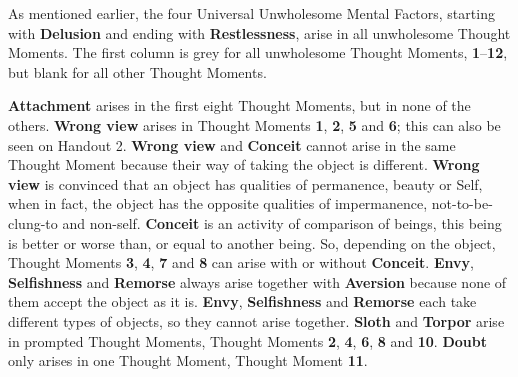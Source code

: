 As mentioned earlier, the four Universal Unwholesome Mental Factors, starting with \textbf{Delusion} and ending with \textbf{Restlessness}, arise in all unwholesome Thought Moments. The first column is grey for all unwholesome Thought Moments, \textbf{1}--\textbf{12}, but blank for all other Thought Moments.

\textbf{Attachment} arises in the first eight Thought Moments, but in none of the others. \textbf{Wrong view} arises in Thought Moments \textbf{1}, \textbf{2}, \textbf{5} and \textbf{6}; this can also be seen on Handout 2. \textbf{Wrong view} and \textbf{Conceit} cannot arise in the same Thought Moment because their way of taking the object is different. \textbf{Wrong view} is convinced that an object has qualities of permanence, beauty or Self, when in fact, the object has the opposite qualities of impermanence, not-to-be-clung-to and non-self. \textbf{Conceit} is an activity of comparison of beings, this being is better or worse than, or equal to another being. So, depending on the object, Thought Moments \textbf{3}, \textbf{4}, \textbf{7} and \textbf{8} can arise with or without \textbf{Conceit}. \textbf{Envy}, \textbf{Selfishness} and \textbf{Remorse} always arise together with \textbf{Aversion} because none of them accept the object as it is. \textbf{Envy}, \textbf{Selfishness} and \textbf{Remorse} each take different types of objects, so they cannot arise together. \textbf{Sloth} and \textbf{Torpor} arise in prompted Thought Moments, Thought Moments \textbf{2}, \textbf{4}, \textbf{6}, \textbf{8} and \textbf{10}. \textbf{Doubt} only arises in one Thought Moment, Thought Moment \textbf{11}.

